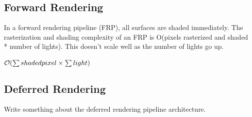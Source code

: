 \subsection{Forward Rendering}

In a forward rendering pipeline (FRP), all surfaces are shaded immediately. The rasterization and shading complexity of an FRP is O(pixels rasterized and shaded * number of lights). This doesn't scale well as the number of lights go up.

\begin{math}
	\mathcal{O}(\sum {shaded pixel} \times \sum light)
\end{math}

\subsection{Deferred Rendering}

Write something about the deferred rendering pipeline architecture.